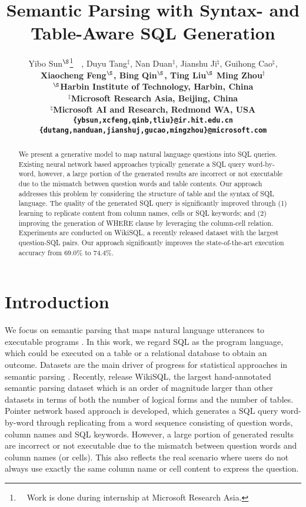 \documentclass[11pt,a4paper]{article}
\title{Semantic Parsing with Syntax- and Table-Aware SQL Generation}
\author{Yibo Sun$^\S$\thanks{\ \ Work is done during internship at Microsoft Research Asia.}\ \ , Duyu Tang$^\ddag$, Nan Duan$^\ddag$, Jianshu Ji$^\natural$, Guihong Cao$^\natural$,  \\
	\bf Xiaocheng Feng$^\S$, Bing Qin$^\S$, Ting Liu$^\S$ Ming Zhou$^\ddag$ \\
	$^\S$Harbin Institute of Technology, Harbin, China\\
	$^\ddag$Microsoft Research Asia, Beijing, China \\
	$^\natural$Microsoft AI and Research, Redmond WA, USA\\
	{\small \tt \{ybsun,xcfeng,qinb,tliu\}@ir.hit.edu.cn}\\
	{\small \tt \{dutang,nanduan,jianshuj,gucao,mingzhou\}@microsoft.com}}
\date{}
\begin{document}
	\maketitle
	
\begin{abstract}
We present a generative model to map natural language questions into SQL queries.
Existing neural network based approaches typically generate a SQL query word-by-word, however, a large portion of the generated results are incorrect or not executable due to the mismatch between question words and table contents.
Our approach addresses this problem by considering the structure of table and the syntax of SQL language.
The quality of the generated SQL query is significantly improved through (1) learning to replicate content from column names, cells or SQL keywords;
and (2) improving the generation of WHERE clause by leveraging the column-cell relation.
Experiments are conducted on WikiSQL, a recently released dataset with the largest question-SQL pairs.
Our approach significantly improves the state-of-the-art execution accuracy from 69.0\% to 74.4\%.
\end{abstract}








\section{Introduction}

We focus on semantic parsing that maps natural language utterances to executable \mbox{programs}
\cite{zelle1996learning,wong2007learning,zettlemoyer2007online,kwiatkowski2011lexical,pasupat-liang:2015:ACL-IJCNLP,iyer-EtAl:2017:Long,iyyer-yih-chang:2017:Long}.
In this work, we regard SQL as the program language, which could be executed on a table or a relational database to obtain an outcome.
Datasets are the main driver of progress for statistical approaches in semantic parsing \cite{liang2016learning}.
Recently,  release WikiSQL, the largest hand-annotated semantic parsing dataset which is an order of magnitude larger than other datasets in terms of both the number of logical forms and the number of tables.
Pointer network \cite{vinyals2015pointer} based approach is developed, which generates a SQL query word-by-word through replicating from a word sequence consisting of question words, column names and SQL keywords.
However, a large portion of generated results are incorrect or not executable due to the mismatch between question words and column names (or cells).
This also reflects the real scenario where users do not always use exactly the same column name or cell content to express the question.
\end{document}
